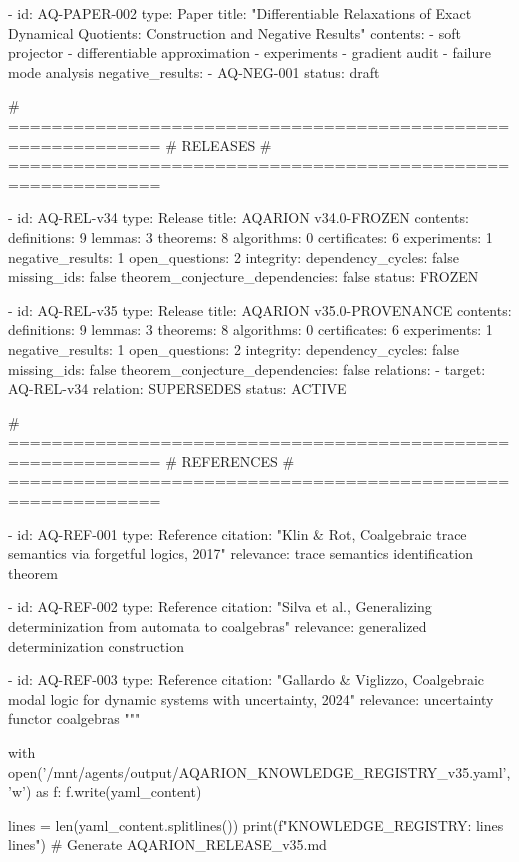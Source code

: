   - id: AQ-PAPER-002
    type: Paper
    title: "Differentiable Relaxations of Exact Dynamical Quotients: Construction and Negative Results"
    contents:
      - soft projector
      - differentiable approximation
      - experiments
      - gradient audit
      - failure mode analysis
    negative_results:
      - AQ-NEG-001
    status: draft

  # ============================================================
  # RELEASES
  # ============================================================

  - id: AQ-REL-v34
    type: Release
    title: AQARION v34.0-FROZEN
    contents:
      definitions: 9
      lemmas: 3
      theorems: 8
      algorithms: 0
      certificates: 6
      experiments: 1
      negative_results: 1
      open_questions: 2
    integrity:
      dependency_cycles: false
      missing_ids: false
      theorem_conjecture_dependencies: false
    status: FROZEN

  - id: AQ-REL-v35
    type: Release
    title: AQARION v35.0-PROVENANCE
    contents:
      definitions: 9
      lemmas: 3
      theorems: 8
      algorithms: 0
      certificates: 6
      experiments: 1
      negative_results: 1
      open_questions: 2
    integrity:
      dependency_cycles: false
      missing_ids: false
      theorem_conjecture_dependencies: false
    relations:
      - target: AQ-REL-v34
        relation: SUPERSEDES
    status: ACTIVE

  # ============================================================
  # REFERENCES
  # ============================================================

  - id: AQ-REF-001
    type: Reference
    citation: "Klin & Rot, Coalgebraic trace semantics via forgetful logics, 2017"
    relevance: trace semantics identification theorem

  - id: AQ-REF-002
    type: Reference
    citation: "Silva et al., Generalizing determinization from automata to coalgebras"
    relevance: generalized determinization construction

  - id: AQ-REF-003
    type: Reference
    citation: "Gallardo & Viglizzo, Coalgebraic modal logic for dynamic systems with uncertainty, 2024"
    relevance: uncertainty functor coalgebras
"""

with open('/mnt/agents/output/AQARION_KNOWLEDGE_REGISTRY_v35.yaml', 'w') as f:
    f.write(yaml_content)

lines = len(yaml_content.splitlines())
print(f"KNOWLEDGE_REGISTRY: {lines} lines")
# Generate AQARION_RELEASE_v35.md

